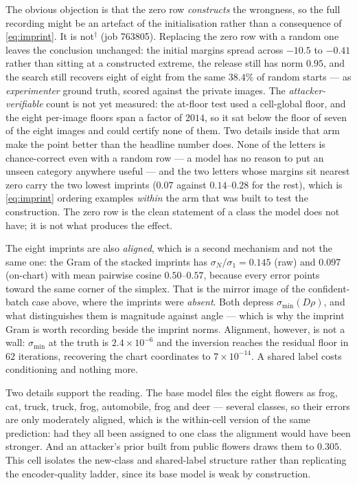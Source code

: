 The obvious objection is that the zero row \emph{constructs} the wrongness, so
the full recording might be an artefact of the initialisation rather than a
consequence of \eqref{eq:imprint}. It is not$^\dagger$ (job 763805). Replacing
the zero row with a random one leaves the conclusion unchanged: the initial
margins spread across $-10.5$ to $-0.41$ rather than sitting at a constructed
extreme, the release still has norm $0.95$, and the search still recovers
eight of eight from the same $38.4\%$ of random starts --- as \emph{experimenter}
ground truth, scored against the private images. The \emph{attacker-verifiable}
count is not yet measured: the at-floor test used a cell-global floor, and the
eight per-image floors span a factor of $2014$, so it sat below the floor of
seven of the eight images and could certify none of them. Two details inside
that arm make the point better than the headline number does. None of the
letters is chance-correct even with a random row --- a model has no reason to
put an unseen category anywhere useful --- and the two letters whose margins
sit nearest zero carry the two lowest imprints ($0.07$ against $0.14$--$0.28$
for the rest), which is \eqref{eq:imprint} ordering examples \emph{within} the
arm that was built to test the construction. The zero row is the clean
statement of a class the model does not have; it is not what produces the
effect.

The eight imprints are also \emph{aligned}, which is a second mechanism and
not the same one: the Gram of the stacked imprints has
$\sigma_N/\sigma_1=0.145$ (raw) and $0.097$ (on-chart) with mean pairwise
cosine $0.50$--$0.57$, because every error points toward the same corner of
the simplex. That is the mirror image of the confident-batch case above,
where the imprints were \emph{absent}. Both depress $\sigma_{\min}(D\rho)$,
and what distinguishes them is magnitude against angle — which is why the
imprint Gram is worth recording beside the imprint norms. Alignment,
however, is not a wall: $\sigma_{\min}$ at the truth is $2.4\times10^{-6}$
and the inversion reaches the residual floor in $62$ iterations, recovering
the chart coordinates to $7\times10^{-14}$. A shared label costs
conditioning and nothing more.

Two details support the reading. The base model files the eight flowers as
frog, cat, truck, truck, frog, automobile, frog and deer — several classes,
so their errors are only moderately aligned, which is the within-cell version
of the same prediction: had they all been assigned to one class the
alignment would have been stronger. And an attacker's prior built from
public flowers draws them to $0.305$. This cell isolates the new-class and
shared-label structure rather than replicating the encoder-quality ladder,
since its base model is weak by construction.

